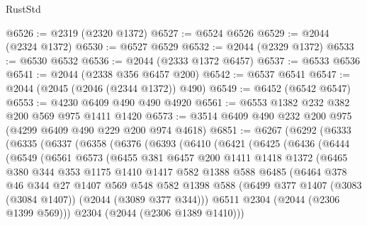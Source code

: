 \begin{lexlean}{RustStd}
\begin{coremodule}
{\begin{coremodule}
{{{{{{{{{{{{{{@6526 := @2319 (@2320 @1372)
@6527 := @6524 @6526
@6529 := @2044 (@2324 @1372)
@6530 := @6527 @6529
@6532 := @2044 (@2329 @1372)
@6533 := @6530 @6532
@6536 := @2044 (@2333 @1372 @6457)
@6537 := @6533 @6536
@6541 := @2044 (@2338 @356 @6457 @200)
@6542 := @6537 @6541
@6547 := @2044 (@2045 (@2046 (@2344 @1372)) @490)
@6549 := @6452 (@6542 @6547)
@6553 := @4230 @6409 @490 @490 @4920
@6561 := @6553 @1382 @232 @382 @200 @569 @975 @1411 @1420
@6573 := @3514 @6409 @490 @232 @200 @975 (@4299 @6409 @490 @229 @200 @974 @4618)
@6851 := @6267
    (@6292
      (@6333
        (@6335
          (@6337
            (@6358
              (@6376
                (@6393
                  (@6410
                    (@6421
                      (@6425
                        (@6436
                          (@6444
                            (@6549
                              (@6561
                                @6573
                                (@6455
                                  @381
                                  @6457
                                  @200
                                  @1411
                                  @1418
                                  @1372
                                  (@6465
                                    @380
                                    @344
                                    @353
                                    @1175
                                    @1410
                                    @1417
                                    @582
                                    @1388
                                    @588
                                    @6485
                                    (@6464
                                      @378
                                      @46
                                      @344
                                      @27
                                      @1407
                                      @569
                                      @548
                                      @582
                                      @1398
                                      @588
                                      (@6499
                                        @377
                                        @1407
                                        (@3083 (@3084 @1407))
                                        (@2044 (@3089 @377 @344)))
                                      @6511
                                      @2304
                                      (@2044 (@2306 @1399 @569)))
                                    @2304
                                    (@2044 (@2306 @1389 @1410)))
}}}}}}}}}}}}}}
\end{coremodule}}
\end{coremodule}
\end{lexlean}
